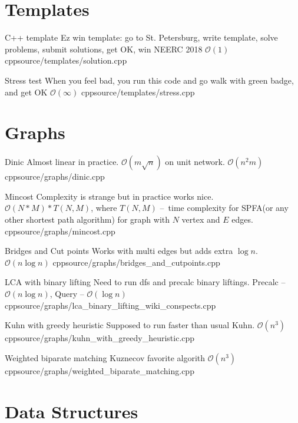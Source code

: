 \documentclass[landscape, 10pt, a4paper, oneside, twocolumn]{extarticle}
\begin{document}
\maketitlepage


\section{Templates}

\Algorithm
{C++ template}
{Ez win template: go to St. Petersburg, write template, solve problems, submit solutions, get OK, win NEERC 2018}
{$\mathcal{O}(1)$}
{cpp}{source/templates/solution.cpp}

\Algorithm
{Stress test}
{When you feel bad, you run this code and go walk with green badge, and get OK}
{$\mathcal{O}(\infty)$}
{cpp}{source/templates/stress.cpp}

\section{Graphs}

\Algorithm
{Dinic}
{Almost linear in practice. $\mathcal{O}(m \sqrt n)$ on unit network.}
{$\mathcal{O}(n^{2}m)$}
{cpp}{source/graphs/dinic.cpp}

\Algorithm
{Mincost}
{Complexity is strange but in practice works nice.}
{$\mathcal{O}(N * M) * T(N, M)$, where $T(N, M)$ – time complexity for SPFA(or any other shortest path algorithm) for graph with $N$ vertex and $E$ edges.}
{cpp}{source/graphs/mincost.cpp}

\Algorithm
{Bridges and Cut points}
{Works with multi edges but adds extra $ \log n$.}
{$\mathcal{O}(n \log n)$}
{cpp}{source/graphs/bridges_and_cutpoints.cpp}

\Algorithm
{LCA with binary lifting}
{Need to run dfs and precalc binary liftings.}
{Precalc – $\mathcal{O}(n \log n)$, Query – $\mathcal{O}(\log n)$}
{cpp}{source/graphs/lca_binary_lifting_wiki_conspects.cpp}

\Algorithm
{Kuhn with greedy heuristic}
{Supposed to run faster than usual Kuhn.}
{$\mathcal{O}(n^{3})$}
{cpp}{source/graphs/kuhn_with_greedy_heuristic.cpp}

\Algorithm
{Weighted biparate matching}
{Kuznecov favorite algorith}
{$\mathcal{O}(n^{3})$}
{cpp}{source/graphs/weighted_biparate_matching.cpp}



\section{Data Structures}
\end{document}
